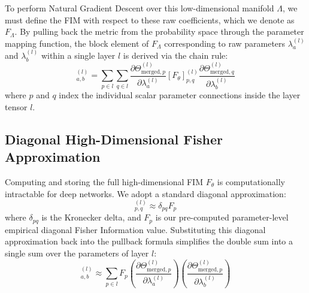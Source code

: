 \documentclass{article}
\theoremstyle{plain}
\theoremstyle{definition}
\theoremstyle{remark}
\begin{document}
To perform Natural Gradient Descent over this low-dimensional manifold $\Lambda$, we must define the FIM with respect to these raw coefficients, which we denote as $F_{\Lambda}$. By pulling back the metric from the probability space through the parameter mapping function, the block element of $F_{\Lambda}$ corresponding to raw parameters $\lambda_a^{(l)}$ and $\lambda_b^{(l)}$ within a single layer $l$ is derived via the chain rule:
\begin{equation}
    [F_{\Lambda}]_{a, b}^{(l)} = \sum_{p \in l} \sum_{q \in l} \frac{\partial \Theta_{\text{merged}, p}^{(l)}}{\partial \lambda_a^{(l)}} [F_{\theta}]_{p, q}^{(l)} \frac{\partial \Theta_{\text{merged}, q}^{(l)}}{\partial \lambda_b^{(l)}}
\end{equation}
where $p$ and $q$ index the individual scalar parameter connections inside the layer tensor $l$.

\subsection{Diagonal High-Dimensional Fisher Approximation}
Computing and storing the full high-dimensional FIM $F_{\theta}$ is computationally intractable for deep networks. We adopt a standard diagonal approximation:
\begin{equation}
    [F_{\theta}]_{p, q}^{(l)} \approx \delta_{pq} F_p
\end{equation}
where $\delta_{pq}$ is the Kronecker delta, and $F_p$ is our pre-computed parameter-level empirical diagonal Fisher Information value. Substituting this diagonal approximation back into the pullback formula simplifies the double sum into a single sum over the parameters of layer $l$:
\begin{equation}
    [F_{\Lambda}]_{a, b}^{(l)} \approx \sum_{p \in l} F_p \left( \frac{\partial \Theta_{\text{merged}, p}^{(l)}}{\partial \lambda_a^{(l)}} \right) \left( \frac{\partial \Theta_{\text{merged}, p}^{(l)}}{\partial \lambda_b^{(l)}} \right)
\end{equation}
\end{document}
